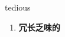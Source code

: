 
\begin{frame}
{\huge tedious}
\begin{center}
\begin{enumerate}\Large
  \item \textbf{冗长乏味的}
\end{enumerate}
\end{center}
\end{frame}
